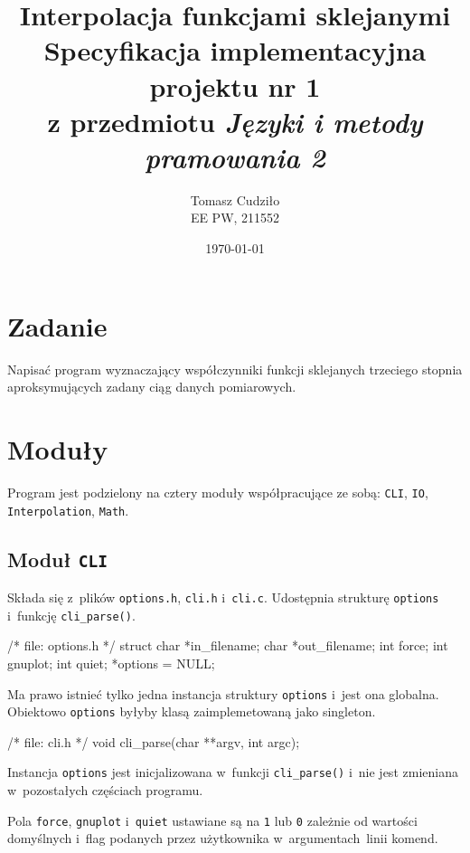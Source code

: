 \documentclass[10pt,a4paper]{article}
\newcommand{\p}[1]{\texttt{#1}}
\begin{document}
\title{ 
  Interpolacja funkcjami sklejanymi\\
  {\normalsize Specyfikacja implementacyjna projektu nr 1}\\\vspace{-12pt}
  {\normalsize z przedmiotu \emph{Języki i metody pramowania 2}}
}
\author{
  Tomasz Cudziło\\
  {\small EE PW, 211552}
}
\date{\today}
\maketitle

\section*{Zadanie}
\label{sec:zadanie}

Napisać program wyznaczający współczynniki funkcji sklejanych trzeciego stopnia
aproksymujących zadany ciąg danych pomiarowych.

\vspace{24pt}

\section{Moduły}
Program jest podzielony na cztery moduły współpracujące ze sobą: \p{CLI},
\p{IO}, \p{Interpolation}, \p{Math}.

\subsection{Moduł \p{CLI}}
Składa się z~plików \p{options.h}, \p{cli.h} i~\p{cli.c}. Udostępnia strukturę
\p{options} i~funkcję \p{cli\_parse()}.
\begin{SmallVerbatim}
    /* file: options.h */
    struct {
      char *in_filename;
      char *out_filename;
      int force;
      int gnuplot;
      int quiet;
    } *options = NULL;
\end{SmallVerbatim}
Ma prawo istnieć tylko jedna instancja struktury \p{options} i~jest ona
globalna. Obiektowo \p{options} byłyby klasą zaimplemetowaną jako singleton.
\begin{SmallVerbatim}
    /* file: cli.h */
    void cli_parse(char **argv, int argc);
\end{SmallVerbatim}
Instancja \p{options} jest inicjalizowana w~funkcji \p{cli\_parse()} i~nie jest
zmieniana w~pozostałych częściach programu.

Pola \p{force}, \p{gnuplot} i~\p{quiet} ustawiane są na \p{1} lub \p{0}
zależnie od wartości domyślnych i~flag podanych przez użytkownika
w~argumentach~linii komend.
\end{document}
